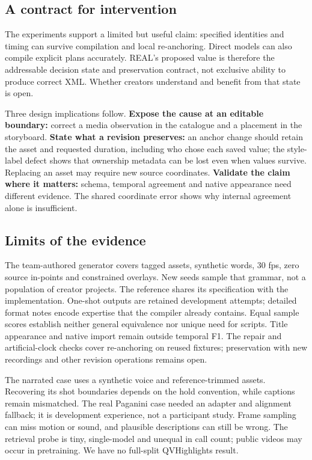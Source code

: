 \documentclass{ceurart}
\begin{document}
\subsection{A contract for
intervention}\label{a-contract-for-intervention}

The experiments support a limited but useful claim: specified identities
and timing can survive compilation and local re-anchoring. Direct models
can also compile explicit plans accurately. REAL's proposed value is
therefore the addressable decision state and preservation contract, not
exclusive ability to produce correct XML. Whether creators understand
and benefit from that state is open.

Three design implications follow. \textbf{Expose the cause at an
editable boundary:} correct a media observation in the catalogue and a
placement in the storyboard. \textbf{State what a revision preserves:}
an anchor change should retain the asset and requested duration,
including who chose each saved value; the style-label defect shows that
ownership metadata can be lost even when values survive. Replacing an
asset may require new source coordinates. \textbf{Validate the claim
where it matters:} schema, temporal agreement and native appearance need
different evidence. The shared coordinate error shows why internal
agreement alone is insufficient.

\subsection{Limits of the evidence}\label{limits-of-the-evidence}

The team-authored generator covers tagged assets, synthetic words, 30
fps, zero source in-points and constrained overlays. New seeds sample
that grammar, not a population of creator projects. The reference shares
its specification with the implementation. One-shot outputs are retained
development attempts; detailed format notes encode expertise that the
compiler already contains. Equal sample scores establish neither general
equivalence nor unique need for scripts. Title appearance and native
import remain outside temporal F1. The repair and artificial-clock
checks cover re-anchoring on reused fixtures; preservation with new
recordings and other revision operations remains open.

The narrated case uses a synthetic voice and reference-trimmed assets.
Recovering its shot boundaries depends on the hold convention, while
captions remain mismatched. The real Paganini case needed an adapter and
alignment fallback; it is development experience, not a participant
study. Frame sampling can miss motion or sound, and plausible
descriptions can still be wrong. The retrieval probe is tiny,
single-model and unequal in call count; public videos may occur in
pretraining. We have no full-split QVHighlights result.
\end{document}
